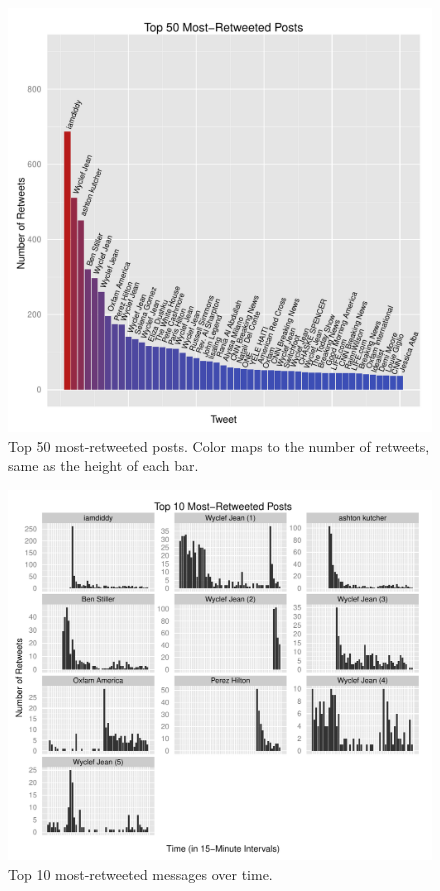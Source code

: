 \documentclass[a4paper, 11pt, titlepage]{article}
\begin{document}
\begin{figure}[h]
\centering
\includegraphics[width=120mm]{../figures/rt_top_50}
\caption{Top 50 most-retweeted posts. Color maps to the number of retweets, same as the height of each bar.}
\label{fig:rt_top_50}
\end{figure}

\begin{figure}[h]
  \centering
\includegraphics[width=120mm]{../figures/rt_top_10_over_time_free_scale}
\caption{Top 10 most-retweeted messages over time.}
\label{fig:rt_top_10}
\end{figure}
\end{document}
